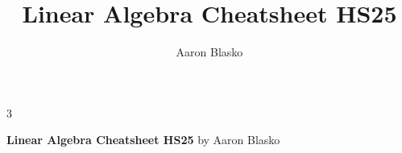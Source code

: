 \documentclass[8pt, a4paper]{extarticle}
\title{Linear Algebra Cheatsheet HS25}
\author{Aaron Blasko}
\date{}
\numberwithin{equation}{section}
\begin{document}
\begin{multicols*}{3}

    {\large \textbf{Linear Algebra Cheatsheet HS25}}
    by Aaron Blasko

    
    
    
    
    
    
    
    
    
    

\end{multicols*}

\pagebreak

\clearpage
\end{document}
